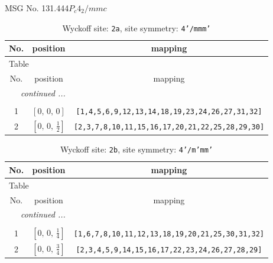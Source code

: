 \documentclass[fleqn,8pt]{jsarticle}
\begin{document}
\setcounter{MaxMatrixCols}{32}

\renewcommand{\tablename}{Table~}
\renewcommand{\figurename}{Figure~}
\begin{center}
\LARGE
MSG No. 131.444\quad$P_{c}4_{2}/mmc$
\end{center}
\renewcommand{\arraystretch}{1.2}
\begin{longtable}{ccc}
\caption{Wyckoff site: {\tt 2a}, site symmetry: {\tt 4'/mmm'}}
 \\
 \hline \hline
No. & position & mapping \\ \hline \endfirsthead

\multicolumn{2}{l}{\tablename\ \thetable{}} \\
 \hline \hline
No. & position & mapping \\ \hline \endhead

 \hline \hline
\multicolumn{2}{r}{\footnotesize\it continued ...} \\ \endfoot

 \hline \hline
\multicolumn{2}{r}{} \\ \endlastfoot

1 & $\left[ 0,\, 0,\, 0 \right]$ & {\tt [1,4,5,6,9,12,13,14,18,19,23,24,26,27,31,32]} \\ \hline
2 & $\left[ 0,\, 0,\, \frac{1}{2} \right]$ & {\tt [2,3,7,8,10,11,15,16,17,20,21,22,25,28,29,30]} \\
\end{longtable}
\renewcommand{\arraystretch}{1.2}
\begin{longtable}{ccc}
\caption{Wyckoff site: {\tt 2b}, site symmetry: {\tt 4'/m'mm'}}
 \\
 \hline \hline
No. & position & mapping \\ \hline \endfirsthead

\multicolumn{2}{l}{\tablename\ \thetable{}} \\
 \hline \hline
No. & position & mapping \\ \hline \endhead

 \hline \hline
\multicolumn{2}{r}{\footnotesize\it continued ...} \\ \endfoot

 \hline \hline
\multicolumn{2}{r}{} \\ \endlastfoot

1 & $\left[ 0,\, 0,\, \frac{1}{4} \right]$ & {\tt [1,6,7,8,10,11,12,13,18,19,20,21,25,30,31,32]} \\ \hline
2 & $\left[ 0,\, 0,\, \frac{3}{4} \right]$ & {\tt [2,3,4,5,9,14,15,16,17,22,23,24,26,27,28,29]} \\
\end{longtable}
\end{document}
